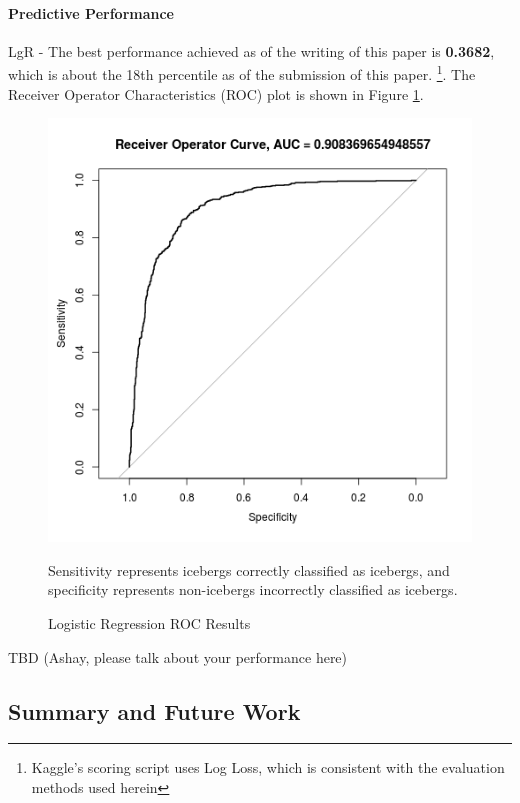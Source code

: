 \documentclass[fleqn,10pt]{SelfArx} %
\begin{document}
\paragraph{Predictive Performance}
LgR - The best performance achieved as of the writing of this paper is \textbf{0.3682}, which is about the 18th percentile as of the submission of this paper. \footnote{Kaggle's scoring script uses Log Loss, which is consistent with the evaluation methods used herein}.  The Receiver Operator Characteristics (ROC) plot is shown in Figure \ref{roc}.

\begin{figure}
	\centering
	\includegraphics[width=0.9\linewidth]{iceberg/ROC_Results.png}
	\caption{Logistic Regression ROC Results}\label{roc}
	\small
	Sensitivity represents icebergs correctly classified as icebergs, and specificity represents non-icebergs incorrectly classified as icebergs.
\end{figure}

TBD (Ashay, please talk about your performance here)

\subsection{Summary and Future Work}
\end{document}
